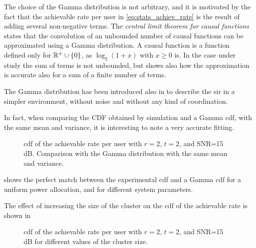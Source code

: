 The choice of the Gamma distribution is not arbitrary, and it is motivated by
the fact that the achievable rate per user in \eqref{eq:stats_achiev_rate} is
the result of adding several non-negative terms. The \emph{central limit theorem
for causal functions} \cite{papoulis_fourier} states that the convolution of an
unbounded number of causal functions can be approximated using a Gamma
distribution. A causal function is a function defined only for $\mathbb{R}^{+}
\cup \left\{0\right\}$, as $\log_2\left(1+x\right)$ with $x \geq 0$ is. In the
case under study the sum of terms is not unbounded, but \cite{papoulis_fourier}
shows also how the approximation is accurate also for a sum of a finite number
of terms.

The Gamma distribution has been introduced also in \cite{cheikh11} to describe
the \gls{sir} in a simpler environment, without noise and without any kind of
coordination.

In fact, when comparing the CDF obtained by simulation and a Gamma \gls{cdf},
with the same mean and variance, it is interesting to note a very accurate
fitting.

\begin{figure}[t]
    \centering
    \begin{minipage}[t]{0.7\textwidth}
        
    \end{minipage}
\caption{\gls{cdf} of the achievable rate per user with $r=2$, $t=2$, and
SNR=15\,dB. Comparison with the Gamma distribution with the same mean and
variance.}
\label{fig:cdf_sim_analy}
\end{figure}

 shows the perfect match between the experimental
\gls{cdf} and a Gamma \gls{cdf} for a uniform power allocation, and for
different system parameters.

The effect of increasing the size of the cluster on the \gls{cdf} of the
achievable rate is shown in 

\begin{figure}[t]
    \centering
    \begin{minipage}[t]{0.7\textwidth}
        
    \end{minipage}
\caption{\gls{cdf} of the achievable rate per user with $r=2$, $t=2$, and
SNR=15\,dB for different values of the cluster size.}
\label{fig:cdf_cluster_size}
\end{figure}


